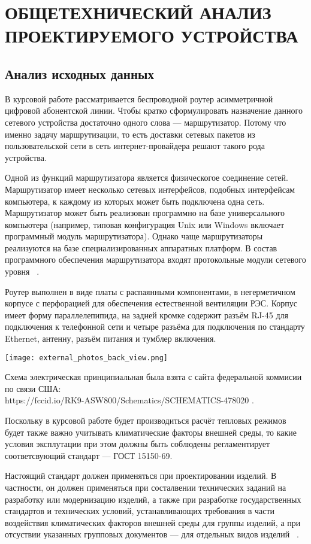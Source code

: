 \section{ОБЩЕТЕХНИЧЕСКИЙ АНАЛИЗ ПРОЕКТИРУЕМОГО УСТРОЙСТВА}
\subsection{Анализ исходных данных}
\par
В курсовой работе рассматривается беспроводной роутер асимметричной
цифровой абонентской линии.  Чтобы кратко сформулировать назначение
данного сетевого устройства достаточно одного слова — маршрутизатор.
Потому что именно задачу маршрутизации, то есть доставки сетевых
пакетов из пользовательской сети в сеть интернет-провайдера решают
такого рода устройства.
\par
Одной из функций маршрутизатора является физическогое соединение
сетей. Маршрутизатор имеет несколько сетевых интерфейсов, подобных
интерфейсам компьютера, к каждому из которых может быть подключена
одна сеть. Маршрутизатор может быть реализован программно на базе
универсального компьютера (например, типовая конфигурация Unix или
Windows включает программный модуль маршрутизатора). Однако чаще
маршрутизаторы реализуются на базе специализированных аппаратных
платформ. В состав программного обеспечения маршрутизатора входят
протокольные модули сетевого уровня ~\cite{NetworksOlifer2016}.

Роутер выполнен в виде платы с распаянными компонентами, в
негерметичном корпусе с перфорацией для обеспечения естественной
вентиляции РЭС. Корпус имеет форму параллелепипида, на задней кромке
содержит разъём RJ-45 для подключения к телефонной сети и четыре
разъёма для подключения по стандарту Ethernet, антенну, разъём питания
и тумблер включения.

\texttt{[image: external\_photos\_back\_view.png]}

Схема электрическая принципиальная была взята с сайта федеральной
коммисии по связи США: \\
https://fccid.io/RK9-ASW800/Schematics/SCHEMATICS-478020 .

Поскольку в курсовой работе будет производиться расчёт тепловых
режимов будет также важно учитывать климатические факторы внешней
среды, то какие условия эксплутации при этом должны быть соблюдены
регламентирует соответсвующий стандарт — ГОСТ 15150-69.

Настоящий стандарт должен применяться при проектировании изделий.  В
частности, он должен применяться при состалвении технических заданий
на разработку или модернизацию изделий, а также при разработке
государственных стандартов и технических условий, устанавливающих
требования в части воздействия климатических факторов внешней среды
для группы изделий, а при отсуствии указанных групповых документов —
для отдельных видов изделий ~\cite{GOST_15150-69}.

